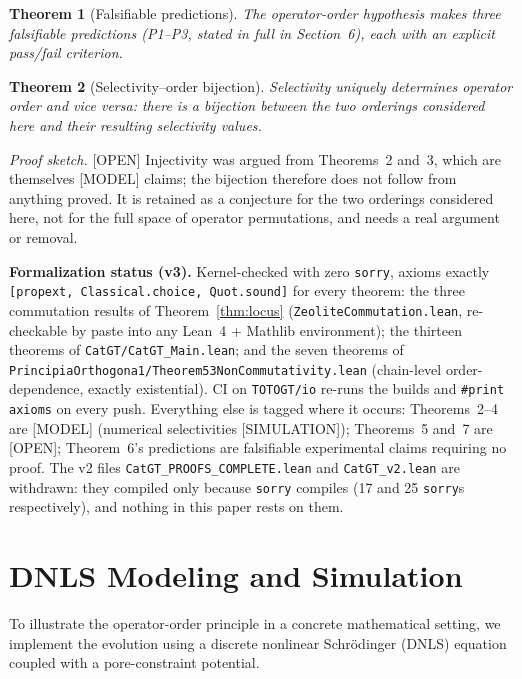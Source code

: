 \documentclass[11pt]{article}
\newtheorem{theorem}{Theorem}
\begin{document}
\begin{theorem}[Falsifiable predictions]
The operator-order hypothesis makes three falsifiable predictions (P1--P3, stated in full in Section~6), each with an explicit pass/fail criterion.
\end{theorem}

\begin{theorem}[Selectivity--order bijection]
Selectivity uniquely determines operator order and vice versa: there is a bijection between the two orderings considered here and their resulting selectivity values.
\end{theorem}
\emph{Proof sketch.} \textnormal{[OPEN]} Injectivity was argued from Theorems~2 and~3, which are themselves [MODEL] claims; the bijection therefore does not follow from anything proved. It is retained as a conjecture for the two orderings considered here, not for the full space of operator permutations, and needs a real argument or removal.

\bigskip
\noindent\textbf{Formalization status (v3).} Kernel-checked with zero \texttt{sorry}, axioms exactly \texttt{[propext, Classical.choice, Quot.sound]} for every theorem: the three commutation results of Theorem~\ref{thm:locus} (\texttt{ZeoliteCommutation.lean}, re-checkable by paste into any Lean~4 + Mathlib environment); the thirteen theorems of \texttt{CatGT/CatGT\_Main.lean}; and the seven theorems of \texttt{PrincipiaOrthogona1/Theorem53NonCommutativity.lean} (chain-level order-dependence, exactly existential). CI on \texttt{TOTOGT/io} re-runs the builds and \texttt{\#print axioms} on every push. Everything else is tagged where it occurs: Theorems~2--4 are [MODEL] (numerical selectivities [SIMULATION]); Theorems~5 and~7 are [OPEN]; Theorem~6's predictions are falsifiable experimental claims requiring no proof. The v2 files \texttt{CatGT\_PROOFS\_COMPLETE.lean} and \texttt{CatGT\_v2.lean} are withdrawn: they compiled only because \texttt{sorry} compiles (17 and 25 \texttt{sorry}s respectively), and nothing in this paper rests on them.

\section{DNLS Modeling and Simulation}

To illustrate the operator-order principle in a concrete mathematical setting, we implement the evolution using a discrete nonlinear Schr\"odinger (DNLS) equation coupled with a pore-constraint potential.
\end{document}
